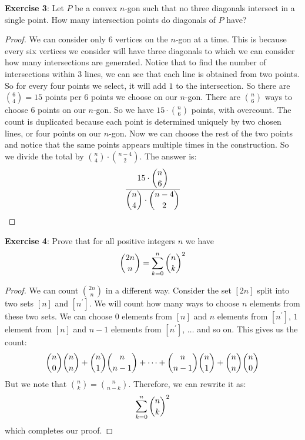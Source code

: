 \documentclass{article}
\begin{document}
\textbf{Exercise 3}: Let $P$ be a convex $n$-gon such that no three diagonals intersect in a single point. How many intersection points do diagonals of $P$ have?
    \begin{proof}
        We can consider only $6$ vertices on the $n$-gon at a time. This is because every six vertices we consider will have three diagonals to which we can consider how many intersections are generated. Notice that to find the number of intersections within $3$ lines, we can see that each line is obtained from two points. So for every four points we select, it will add $1$ to the intersection. So there are $\binom{6}{4} = 15$ points per 6 points we choose on our $n$-gon. There are $\binom{n}{6}$ ways to choose $6$ points on our $n$-gon. So we have $15 \cdot \binom{n}{6}$ points, with overcount. The count is duplicated because each point is determined uniquely by two chosen lines, or four points on our $n$-gon. Now we can choose the rest of the two points and notice that the same points appears multiple times in the construction. So we divide the total by $\binom{n}{4} \cdot \binom{n - 4}{2}$. The answer is:
            \begin{equation*}
                \dfrac{15 \cdot \dbinom{n}{6}}{\dbinom{n}{4} \cdot \dbinom{n - 4}{2}}
            \end{equation*}
    \end{proof}

\textbf{Exercise 4}: Prove that for all positive integers $n$ we have
    \begin{equation*}
        \dbinom{2n}{n} = \sum_{k = 0}^{n} \dbinom{n}{k}^{2}
    \end{equation*}
    \begin{proof}
        We can count $\binom{2n}{n}$ in a different way. Consider the set $[2n]$ split into two sets $[n]$ and $[n^{\prime}]$. We will count how many ways to choose $n$ elements from these two sets. We can choose $0$ elements from $[n]$ and $n$ elements from $[n^{\prime}]$, $1$ element from $[n]$ and $n - 1$ elements from $[n^{\prime}]$, $\ldots$ and so on. This gives us the count:
            \begin{equation*}
                \dbinom{n}{0}\dbinom{n}{n} + \dbinom{n}{1}\dbinom{n}{n - 1} + \cdots + \dbinom{n}{n - 1}\dbinom{n}{1} + \dbinom{n}{n}\dbinom{n}{0}
            \end{equation*}
        But we note that $\binom{n}{k} = \binom{n}{n - k}$. Therefore, we can rewrite it as:
            \begin{equation*}
                \sum_{k = 0}^{n} \dbinom{n}{k}^{2}
            \end{equation*}
        which completes our proof.
    \end{proof}
\end{document}
